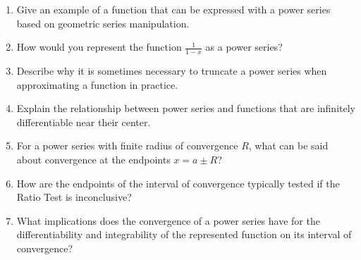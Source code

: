 \begin{enumerate}
\item Give an example of a function that can be expressed with a power series based on geometric series manipulation.

\item How would you represent the function \(\frac{1}{1-x}\) as a power series?

\item Describe why it is sometimes necessary to truncate a power series when approximating a function in practice.

\item Explain the relationship between power series and functions that are infinitely differentiable near their center.

\item For a power series with finite radius of convergence \(R\), what can be said about convergence at the endpoints \(x=a\pm R\)?

\item How are the endpoints of the interval of convergence typically tested if the Ratio Test is inconclusive?

\item What implications does the convergence of a power series have for the differentiability and integrability of the represented function on its interval of convergence?

\end{enumerate}
